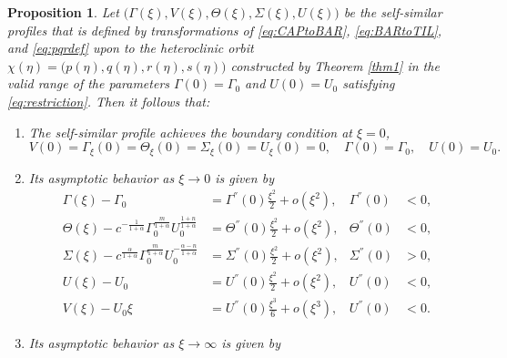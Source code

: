 \documentclass[a4paper,11pt]{article}
\def\blue{\color{blue}}
\newtheorem{proposition}{Proposition}[section]
\theoremstyle{remark}
\begin{document}
%
%
\begin{proposition} \label{prop:ss}
Let $\big(\Gamma(\xi),V(\xi),\Theta(\xi),\Sigma(\xi),U(\xi)\big)$ be the self-similar profiles that is defined by transformations of \eqref{eq:CAPtoBAR}, \eqref{eq:BARtoTIL}, and \eqref{eq:pqrdef} upon to the heteroclinic orbit $\chi(\eta)=\big(p(\eta),q(\eta),r(\eta),s(\eta)\big)$ constructed by Theorem \ref{thm1} in the valid range of the parameters $\Gamma(0)=\Gamma_0$ and $U(0)=U_0$ {\blue satisfying} \eqref{eq:restriction}. Then it follows that:
 \begin{enumerate}
  \item[(i)] The self-similar profile achieves the boundary condition at $\xi=0$,
    \begin{equation*}
    {V}(0) = \Gamma_\xi(0) = \Theta_\xi(0)=\Sigma_\xi(0) = {U}_\xi(0)=0, \quad \Gamma(0)=\Gamma_0, \quad U(0)=U_0.
  \end{equation*}
  \item[(ii)] Its asymptotic behavior as $\xi \rightarrow 0$ is given by
  \begin{equation} \label{eq:ss_asymp0}
  \begin{aligned}
    \Gamma(\xi) -\Gamma_0 &= \Gamma^{''}(0)\frac{\xi^2}{2} + o(\xi^2), & \Gamma^{''}(0)&<0,\\
    \Theta(\xi) - c^{-\frac{1}{1+\alpha}}\Gamma_0^{\frac{m}{1+\alpha}} U_0^{\frac{1+n}{1+\alpha}} &= \Theta^{''}(0)\frac{\xi^2}{2} + o(\xi^2), & \Theta^{''}(0)&<0,\\
    \Sigma(\xi) - c^{\frac{\alpha}{1+\alpha}}\Gamma_0^{\frac{m}{1+\alpha}} U_0^{-\frac{\alpha-n}{1+\alpha}} &= \Sigma^{''}(0)\frac{\xi^2}{2} + o(\xi^2), & \Sigma^{''}(0)&>0, \\
    U(\xi) - U_0 &= U^{''}(0)\frac{\xi^2}{2} + o(\xi^2), & U^{''}(0)&<0,\\
    V(\xi) - U_0\xi &= U^{''}(0)\frac{\xi^3}{6} + o(\xi^3), & U^{''}(0)&<0.
  \end{aligned}
  \end{equation}
  \item[(iii)] Its asymptotic behavior as $\xi \rightarrow \infty$ is given by\\

\end{enumerate}
\end{proposition}
\end{document}
